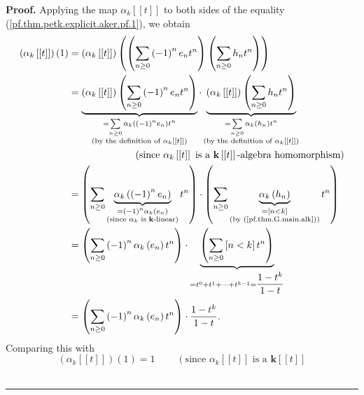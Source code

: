 \documentclass[numbers=enddot,12pt,final,onecolumn,notitlepage]{scrartcl}%
\theoremstyle{definition}
\newenvironment{proof}[1][Proof]{\noindent\textbf{#1.} }{\ \rule{0.5em}{0.5em}}
\let\sumnonlimits\sum
\renewcommand{\sum}{\sumnonlimits\limits}
\begin{document}
\begin{proof}
Applying the map $\alpha_{k}\left[  \left[  t\right]  \right]  $ to both sides
of the equality (\ref{pf.thm.petk.explicit.aker.pf.1}), we obtain%
\begin{align*}
\left(  \alpha_{k}\left[  \left[  t\right]  \right]  \right)  \left(
1\right)   &  =\left(  \alpha_{k}\left[  \left[  t\right]  \right]  \right)
\left(  \left(  \sum_{n\geq0}\left(  -1\right)  ^{n}e_{n}t^{n}\right)  \left(
\sum_{n\geq0}h_{n}t^{n}\right)  \right) \\
&  =\underbrace{\left(  \alpha_{k}\left[  \left[  t\right]  \right]  \right)
\left(  \sum_{n\geq0}\left(  -1\right)  ^{n}e_{n}t^{n}\right)  }%
_{\substack{=\sum_{n\geq0}\alpha_{k}\left(  \left(  -1\right)  ^{n}%
e_{n}\right)  t^{n}\\\text{(by the definition of }\alpha_{k}\left[  \left[
t\right]  \right]  \text{)}}}\cdot\underbrace{\left(  \alpha_{k}\left[
\left[  t\right]  \right]  \right)  \left(  \sum_{n\geq0}h_{n}t^{n}\right)
}_{\substack{=\sum_{n\geq0}\alpha_{k}\left(  h_{n}\right)  t^{n}\\\text{(by
the definition of }\alpha_{k}\left[  \left[  t\right]  \right]  \text{)}}}\\
&  \ \ \ \ \ \ \ \ \ \ \ \ \ \ \ \ \ \ \ \ \left(  \text{since }\alpha
_{k}\left[  \left[  t\right]  \right]  \text{ is a }\mathbf{k}\left[  \left[
t\right]  \right]  \text{-algebra homomorphism}\right) \\
&  =\left(  \sum_{n\geq0}\underbrace{\alpha_{k}\left(  \left(  -1\right)
^{n}e_{n}\right)  }_{\substack{=\left(  -1\right)  ^{n}\alpha_{k}\left(
e_{n}\right)  \\\text{(since }\alpha_{k}\text{ is }\mathbf{k}\text{-linear)}%
}}t^{n}\right)  \cdot\left(  \sum_{n\geq0}\underbrace{\alpha_{k}\left(
h_{n}\right)  }_{\substack{=\left[  n<k\right]  \\\text{(by
(\ref{pf.thm.G.main.alk}))}}}t^{n}\right) \\
&  =\left(  \sum_{n\geq0}\left(  -1\right)  ^{n}\alpha_{k}\left(
e_{n}\right)  t^{n}\right)  \cdot\underbrace{\left(  \sum_{n\geq0}\left[
n<k\right]  t^{n}\right)  }_{=t^{0}+t^{1}+\cdots+t^{k-1}=\dfrac{1-t^{k}}{1-t}%
}\\
&  =\left(  \sum_{n\geq0}\left(  -1\right)  ^{n}\alpha_{k}\left(
e_{n}\right)  t^{n}\right)  \cdot\dfrac{1-t^{k}}{1-t}.
\end{align*}
Comparing this with%
\[
\left(  \alpha_{k}\left[  \left[  t\right]  \right]  \right)  \left(
1\right)  =1\ \ \ \ \ \ \ \ \ \ \left(  \text{since }\alpha_{k}\left[  \left[
t\right]  \right]  \text{ is a }\mathbf{k}\left[  \left[  t\right]  \right]
\]
\end{proof}
\end{document}

